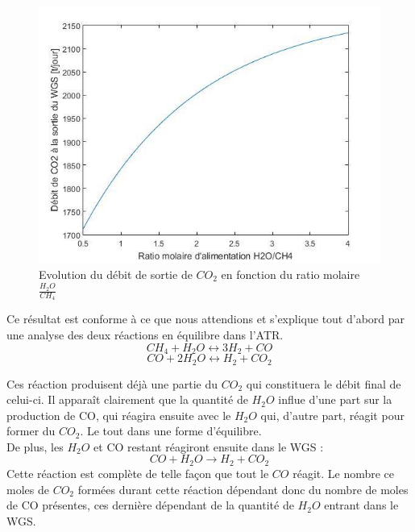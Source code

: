 \documentclass[12pt]{report}
\begin{document}
\begin{figure}[H]
\begin{center}
\includegraphics[scale=0.6]{debit_CO2_ratio_H2O}
\caption{Evolution du débit de sortie de $CO_2$ en fonction du ratio molaire $\frac{H_2O}{CH_4}$}
\end{center}
\end{figure}

Ce résultat est conforme à ce que nous attendions et s'explique tout d'abord par une analyse des deux réactions en équilibre dans l'ATR.
 \begin{equation}
 CH_4 + H_2O \leftrightarrow 3H_2 + CO
 \end{equation}
 \begin{equation}
 CO + 2H_2O \leftrightarrow H_2 + CO_2
 \end{equation}
 
Ces réaction produisent déjà une partie du $CO_2$ qui constituera le débit final de celui-ci. Il apparaît clairement que la quantité de $H_2O$ influe d'une part sur la production de CO, qui réagira ensuite avec le $H_2O$ qui, d'autre part, réagit pour former du $CO_2$. Le tout dans une forme d'équilibre.\\

De plus, les $H_2O$ et CO restant réagiront ensuite dans le WGS :
\begin{equation}
CO + H_2O \rightarrow H_2 + CO_2
\end{equation}
Cette réaction est complète de telle façon que tout le $CO$ réagit. Le nombre ce moles de $CO_2$ formées durant cette réaction dépendant donc du nombre de moles de CO présentes, ces dernière dépendant de la quantité de $H_2O$ entrant dans le WGS.\\
\end{document}
